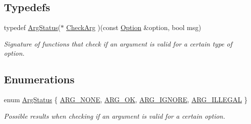 \subsection*{\-Typedefs}
\begin{DoxyCompactItemize}
\item 
typedef \hyperlink{namespaceoption_aee8c76a07877335762631491e7a5a1a9}{\-Arg\-Status}($\ast$ \hyperlink{namespaceoption_a4afb7f04597f34439679509baf4b6d39}{\-Check\-Arg} )(const \hyperlink{classoption_1_1_option}{\-Option} \&option, bool msg)
\begin{DoxyCompactList}\small\item\em \-Signature of functions that check if an argument is valid for a certain type of option. \end{DoxyCompactList}\end{DoxyCompactItemize}
\subsection*{\-Enumerations}
\begin{DoxyCompactItemize}
\item 
enum \hyperlink{namespaceoption_aee8c76a07877335762631491e7a5a1a9}{\-Arg\-Status} \{ \hyperlink{namespaceoption_aee8c76a07877335762631491e7a5a1a9a353903b042e8eb0aa2f60c0043a58a7e}{\-A\-R\-G\-\_\-\-N\-O\-N\-E}, 
\hyperlink{namespaceoption_aee8c76a07877335762631491e7a5a1a9a445e08cb1747e5a22929e7ef2da43b55}{\-A\-R\-G\-\_\-\-O\-K}, 
\hyperlink{namespaceoption_aee8c76a07877335762631491e7a5a1a9a83e0837c79c957525918111d33cab3a9}{\-A\-R\-G\-\_\-\-I\-G\-N\-O\-R\-E}, 
\hyperlink{namespaceoption_aee8c76a07877335762631491e7a5a1a9a9528e32563b795bd2930b12d0a5e382d}{\-A\-R\-G\-\_\-\-I\-L\-L\-E\-G\-A\-L}
 \}
\begin{DoxyCompactList}\small\item\em \-Possible results when checking if an argument is valid for a certain option. \end{DoxyCompactList}\end{DoxyCompactItemize}
